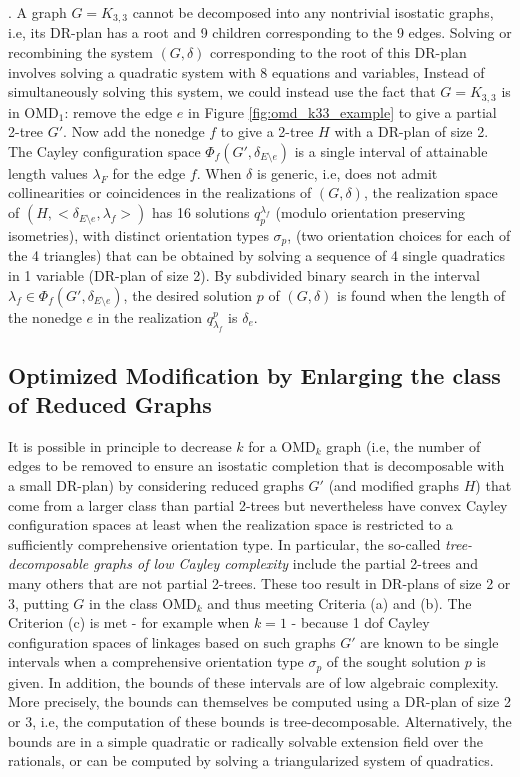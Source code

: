 \medskip{}.
A graph $G=K_{3,3}$  cannot be decomposed into any nontrivial isostatic
graphs, i.e, its DR-plan has a root and 9
children corresponding to the 9 edges. Solving or recombining the system
$(G,\delta)$
corresponding to the root of
this DR-plan involves solving a quadratic system with 8 equations and variables,
Instead of simultaneously solving this system, we could instead use the fact
that $G=K_{3,3}$ is in OMD$_1$: remove the
edge $e$ in Figure \ref{fig:omd_k33_example} to give a partial 2-tree $G'$.
Now add the nonedge $f$ to give a 2-tree $H$ with a DR-plan of size 2.
The Cayley configuration space $\Phi_f(G', \delta_{E\setminus e})$
is a single interval of attainable length values $\lambda_F$ for
the edge $f$.
When $\delta$ is generic, i.e, does not admit collinearities or coincidences
in the realizations of $(G,\delta)$,
the realization space of $(H, <\delta_{E\setminus e}, \lambda_f>)$ has 16
solutions $q_p^{\lambda_f}$ (modulo orientation preserving isometries),
with distinct orientation types $\sigma_p$,
(two orientation choices for each of the 4 triangles)
that can be obtained by solving a sequence of 4 single quadratics in 1
variable (DR-plan of size 2).
By subdivided
binary search
in the interval $\lambda_f \in
\Phi_f(G', \delta_{E\setminus e})$, the desired
solution $p$  of $(G,\delta)$ is found when the length of the nonedge
$e$ in  the realization
$q^p_{\lambda_f}$
is $\delta_e$.
%
\subsection{Optimized Modification by Enlarging the class of Reduced
Graphs}
\label{tdecomp}
It is possible in principle to decrease $k$ for a OMD$_k$ graph
(i.e, the number of edges to be removed
to ensure an isostatic completion that is decomposable with a small DR-plan) by
considering reduced graphs $G'$ (and modified graphs $H$) that come from a larger class than
partial 2-trees but nevertheless have convex Cayley configuration spaces at
least when the realization space is restricted to a sufficiently
comprehensive orientation type.
In particular, the so-called {\em tree-decomposable graphs of low Cayley
complexity} \cite{XX} include the partial 2-trees and many others that are
not partial 2-trees. These too result in DR-plans of size 2 or 3, putting $G$ in the class
OMD$_k$ and thus meeting Criteria (a) and (b). The Criterion (c) is met
- for example when $k=1$ -  because 1 dof Cayley configuration spaces of
linkages based on such graphs $G'$
are known to be single intervals
when a comprehensive orientation type $\sigma_p$ of the sought solution $p$ is given.
In addition, the bounds of these intervals are of low algebraic
complexity.
More precisely, the bounds  can themselves be computed using a DR-plan of size 2 or 3,
i.e, the computation of these bounds is tree-decomposable. Alternatively,
the bounds are in a simple quadratic or radically solvable extension field over the rationals,
or can be computed by solving a
triangularized system of quadratics.

